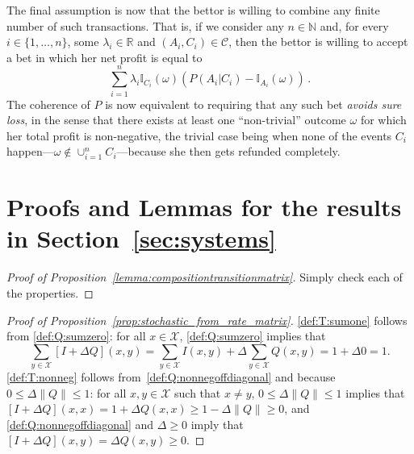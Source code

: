 \documentclass[10pt,a4paper]{paper}
\theoremstyle{definition}
\newcommand{\nats}{\mathbb{N}}
\newcommand{\reals}{\mathbb{R}}
\newcommand{\states}{\mathcal{X}}
\newcommand{\ind}[1]{\mathbb{I}_{#1}}
\newcommand{\norm}[1]{\left\lVert #1 \right\rVert}
\begin{document}
The final assumption is now that the bettor is willing to combine any finite number of such transactions. That is, if we consider any $n\in\nats$ and, for every $i\in\{1,\ldots,n\}$, some $\lambda_i\in\reals$ and $(A_i,C_i)\in\mathcal{C}$, then the bettor is willing to accept a bet in which her net profit is equal to
\begin{equation*}
\sum_{i=1}^n\lambda_i\ind{C_i}(\omega)\left(P(A_i\vert C_i) - \ind{A_i}(\omega)\right)\,.
\end{equation*}
The coherence of $P$ is now equivalent to requiring that any such bet \emph{avoids sure loss}, in the sense that there exists at least one ``non-trivial'' outcome $\omega$ for which her total profit is non-negative, the trivial case being when none of the events $C_i$ happen---$\omega\notin\cup_{i=1}^n C_i$---because she then gets refunded completely. %

\section{Proofs and Lemmas for the results in Section~\ref{sec:systems}}\label{app:systems}

\begin{proof}[Proof of Proposition~\ref{lemma:compositiontransitionmatrix}]
Simply check each of the properties.
\end{proof}


\begin{proof}[Proof of Proposition~\ref{prop:stochastic_from_rate_matrix}]
\ref{def:T:sumone} follows from \ref{def:Q:sumzero}: for all $x\in\states$, \ref{def:Q:sumzero} implies that
\begin{equation*}
\sum_{y\in\states} [I + \Delta Q](x,y) = \sum_{y\in\states}I(x,y) + \Delta \sum_{y\in\states}Q(x,y) = 1+\Delta 0=1.
\end{equation*}
\ref{def:T:nonneg} follows from~\ref{def:Q:nonnegoffdiagonal} and because $0\leq \Delta\norm{Q} \leq 1$: for all $x,y\in\states$ such that $x\neq y$, $0\leq\Delta\norm{Q} \leq 1$ implies that $[I+\Delta Q](x,x)=1+\Delta Q(x,x)\geq 1-\Delta\norm{Q}\geq0$, and \ref{def:Q:nonnegoffdiagonal} and $\Delta\geq0$ imply that $[I+\Delta Q](x,y)=\Delta Q(x,y)\geq0$.
\end{proof}
\end{document}
